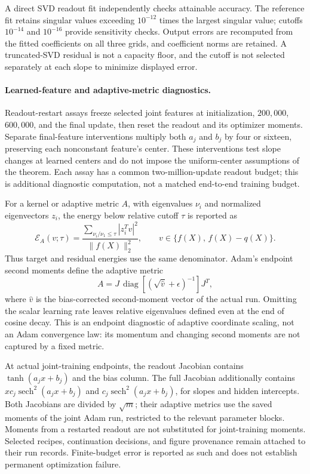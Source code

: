 A direct SVD readout fit independently checks attainable accuracy. The
reference fit retains singular values exceeding $10^{-12}$ times the
largest singular value; cutoffs $10^{-14}$ and $10^{-16}$ provide sensitivity
checks. Output errors are recomputed from the fitted coefficients on all
three grids, and coefficient norms are retained. A truncated-SVD residual
is not a capacity floor, and the cutoff is not selected separately at each
slope to minimize displayed error.

\paragraph{Learned-feature and adaptive-metric diagnostics.}
Readout-restart assays freeze selected joint features at initialization,
$200{,}000$, $600{,}000$, and the final update, then reset the readout and
its optimizer moments. Separate final-feature interventions multiply both
$a_j$ and $b_j$ by four or sixteen, preserving each nonconstant feature's
center. These interventions test slope changes at learned centers and do
not impose the uniform-center assumptions of the theorem. Each assay has a
common two-million-update readout budget; this is additional diagnostic
computation, not a matched end-to-end training budget.

For a kernel or adaptive metric $A$, with eigenvalues $\nu_i$ and normalized
eigenvectors $z_i$, the energy below relative cutoff $\tau$ is reported as
\begin{equation}
 \mathcal E_A(v;\tau)=
 \frac{\sum_{\nu_i/\nu_1\leq\tau}|z_i^Tv|^2}{\|f(X)\|_2^2},
 \qquad v\in\{f(X),\,f(X)-q(X)\}.
\end{equation}
Thus target and residual energies use the same denominator. Adam's endpoint
second moments define the adaptive metric
\begin{equation}
 A=J\,\operatorname{diag}\!\left[
       (\sqrt{\widehat v}+\epsilon)^{-1}\right]J^T,
\end{equation}
where $\widehat v$ is the bias-corrected second-moment vector of the actual
run. Omitting the scalar learning rate leaves relative eigenvalues defined
even at the end of cosine decay. This is an endpoint diagnostic of adaptive
coordinate scaling, not an Adam convergence law: its momentum and changing
second moments are not captured by a fixed metric.

At actual joint-training endpoints, the readout Jacobian contains
$\tanh(a_jx+b_j)$ and the bias column. The full Jacobian additionally
contains $xc_j\operatorname{sech}^2(a_jx+b_j)$ and
$c_j\operatorname{sech}^2(a_jx+b_j)$, for slopes and hidden intercepts.
Both Jacobians are divided by $\sqrt m$; their adaptive metrics use the saved
moments of the joint Adam run, restricted to the relevant parameter blocks.
Moments from a restarted readout are not substituted for joint-training
moments. Selected recipes, continuation decisions, and figure provenance
remain attached to their run records. Finite-budget error is reported as
such and does not establish permanent optimization failure.

